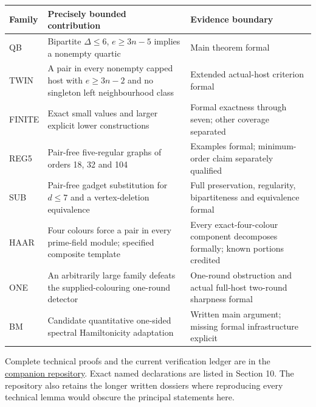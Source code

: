 \documentclass[
  11pt,
]{article}
\newcounter{none} %
\begin{document}
{\def\LTcaptype{none} %
\begin{longtable}[]{@{}
  >{\raggedright\arraybackslash}p{}
  >{\raggedright\arraybackslash}p{}
  >{\raggedright\arraybackslash}p{}@{}}
\toprule\noalign{}
\begin{minipage}[b]{\linewidth}\raggedright
Family
\end{minipage} & \begin{minipage}[b]{\linewidth}\raggedright
Precisely bounded contribution
\end{minipage} & \begin{minipage}[b]{\linewidth}\raggedright
Evidence boundary
\end{minipage} \\
\midrule\noalign{}
\endhead
\bottomrule\noalign{}
\endlastfoot
QB & Bipartite \(\Delta\leq6\), \(e\geq3n-5\) implies a nonempty quartic
& Main theorem formal \\
TWIN & A pair in every nonempty capped host with \(e\geq3n-2\) and no
singleton left neighbourhood class & Extended actual-host criterion
formal \\
FINITE & Exact small values and larger explicit lower constructions &
Formal exactness through seven; other coverage separated \\
REG5 & Pair-free five-regular graphs of orders 18, 32 and 104 & Examples
formal; minimum-order claim separately qualified \\
SUB & Pair-free gadget substitution for \(d\leq7\) and a vertex-deletion
equivalence & Full preservation, regularity, bipartiteness and
equivalence formal \\
HAAR & Four colours force a pair in every prime-field module; specified
composite template & Every exact-four-colour component decomposes
formally; known portions credited \\
ONE & An arbitrarily large family defeats the supplied-colouring
one-round detector & One-round obstruction and actual full-host
two-round sharpness formal \\
BM & Candidate quantitative one-sided spectral Hamiltonicity adaptation
& Written main argument; missing formal infrastructure explicit \\
\end{longtable}
}

Complete technical proofs and the current verification ledger are in the
\href{https://github.com/alejandrozu/openmath-2026-judging/tree/70c5ec3107658182f22c207d4c50f53f9cb3e602/robert-review-2026-10-07}{companion
repository}. Exact named declarations are listed in Section 10. The
repository also retains the longer written dossiers where reproducing
every technical lemma would obscure the principal statements here.
\end{document}
